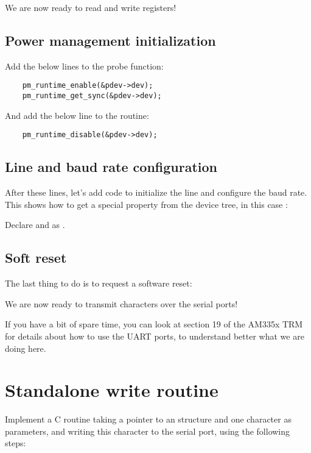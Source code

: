 We are now ready to read and write registers!

\subsection{Power management initialization}

Add the below lines to the probe function:

\begin{verbatim}
    pm_runtime_enable(&pdev->dev);
    pm_runtime_get_sync(&pdev->dev);
\end{verbatim}

And add the below line to the  routine:

\begin{verbatim}
    pm_runtime_disable(&pdev->dev);
\end{verbatim}

\subsection{Line and baud rate configuration}

After these lines, let's add code to initialize the line
and configure the baud rate. This shows how to get a special
property from the device tree, in this case :


Declare  and  as .

\subsection{Soft reset}

The last thing to do is to request a software reset:


We are now ready to transmit characters over the serial ports!

If you have a bit of spare time, you can look at section 19 of the
AM335x TRM for details about how to use the UART ports, to understand
better what we are doing here.
 
\section{Standalone write routine}

Implement a C routine taking a pointer to an 
structure and one character as parameters, and writing
this character to the serial port, using the following steps:

